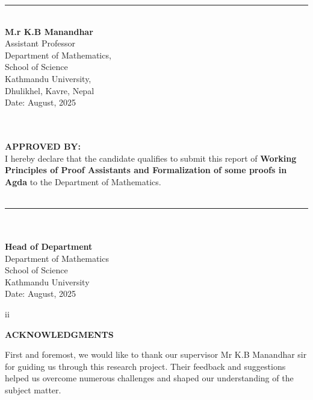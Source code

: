 \documentclass[12pt]{article}
\begin{document}
\vspace{3em}

\noindent
\begin{minipage}{0.45\textwidth}
\rule{6cm}{0.5pt}\\
\textbf{M.r K.B Manandhar }\\
Assistant Professor\\
Department of Mathematics,\\
School of Science\\ Kathmandu University,\\
Dhulikhel, Kavre, Nepal\\
Date: August, 2025

\end{minipage}


\vspace{2.5em}

\noindent
\\ \\ 
\textbf{APPROVED BY:}\\
I hereby declare that the candidate qualifies to submit this report of \textbf{Working Principles of Proof Assistants and Formalization of some proofs in Agda} to the Department of Mathematics.
\\
\vspace{1.7em}
\\
\noindent
\rule{6cm}{0.5pt}\\ \\
\textbf{Head of Department }\\
Department of Mathematics\\
School of Science\\
Kathmandu University\\
Date: August, 2025

\vspace{2em}

\begin{center}
   {\small ii}
\end{center}
\clearpage

\clearpage

\begin{center}
    \textbf{\LARGE ACKNOWLEDGMENTS}
\end{center}
    First and foremost, we would like to thank our supervisor Mr K.B Manandhar sir for guiding us through this research project.
Their feedback and suggestions helped us overcome numerous challenges and shaped
our understanding of the subject matter.
\end{document}
